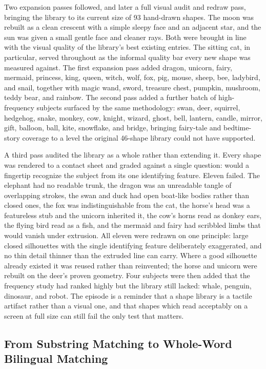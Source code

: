 \documentclass[conference]{IEEEtran}
\begin{document}
Two expansion passes followed, and later a full visual audit and redraw pass, bringing the library to its current size of 93 hand-drawn shapes. The moon was rebuilt as a clean crescent with a simple sleepy face and an adjacent star, and the sun was given a small gentle face and cleaner rays. Both were brought in line with the visual quality of the library's best existing entries. The sitting cat, in particular, served throughout as the informal quality bar every new shape was measured against. The first expansion pass added dragon, unicorn, fairy, mermaid, princess, king, queen, witch, wolf, fox, pig, mouse, sheep, bee, ladybird, and snail, together with magic wand, sword, treasure chest, pumpkin, mushroom, teddy bear, and rainbow. The second pass added a further batch of high-frequency subjects surfaced by the same methodology: swan, deer, squirrel, hedgehog, snake, monkey, cow, knight, wizard, ghost, bell, lantern, candle, mirror, gift, balloon, ball, kite, snowflake, and bridge, bringing fairy-tale and bedtime-story coverage to a level the original 46-shape library could not have supported.

A third pass audited the library as a whole rather than extending it. Every shape was rendered to a contact sheet and graded against a single question: would a fingertip recognize the subject from its one identifying feature. Eleven failed. The elephant had no readable trunk, the dragon was an unreadable tangle of overlapping strokes, the swan and duck had open boat-like bodies rather than closed ones, the fox was indistinguishable from the cat, the horse's head was a featureless stub and the unicorn inherited it, the cow's horns read as donkey ears, the flying bird read as a fish, and the mermaid and fairy had scribbled limbs that would vanish under extrusion. All eleven were redrawn on one principle: large closed silhouettes with the single identifying feature deliberately exaggerated, and no thin detail thinner than the extruded line can carry. Where a good silhouette already existed it was reused rather than reinvented; the horse and unicorn were rebuilt on the deer's proven geometry. Four subjects were then added that the frequency study had ranked highly but the library still lacked: whale, penguin, dinosaur, and robot. The episode is a reminder that a shape library is a tactile artifact rather than a visual one, and that shapes which read acceptably on a screen at full size can still fail the only test that matters.

\subsection{From Substring Matching to Whole-Word Bilingual Matching}
\end{document}
